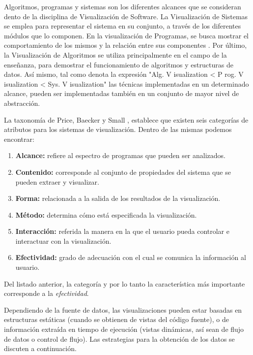 Algoritmos, programas y sistemas son los diferentes alcances que se consideran
dento de la disciplina de Visualización de Software.\cite{[PBS93][Mye90]}
La Visualización de Sistemas se emplea para representar el sistema en su conjunto,
a través de los diferentes módulos que lo componen.
En la visualización de Programas, se busca mostrar el comportamiento de los mismos
y la relación entre sus componentes \cite{BA01}.
Por último, la Visualización de Algoritmos se utiliza principalmente en el campo de la enseñanza,
para demostrar el funcionamiento de algoritmos y estructuras de datos.
Así mismo, tal como denota la expresión 
"Alg. V isualization < P rog. V isualization < Sys. V isualization"\cite{PIROBV-YDS-2007}
las técnicas implementadas en un determinado alcance, pueden ser implementadas
también en un conjunto de mayor nivel de abstracción.

La taxonomía de Price, Baecker y Small \cite{PriceBaeckerSmallXX}, establece que
existen seis categorías de atributos para los sistemas de visualización.
Dentro de las mismas podemos encontrar:
\begin{enumerate}
    \item \textbf{Alcance:} refiere al espectro de programas que pueden ser analizados.
    \item \textbf{Contenido:} corresponde al conjunto de propiedades del sistema que se pueden
    extraer y visualizar.
    \item \textbf{Forma:} relacionada a la salida de los resultados de la visualización.
    \item \textbf{Método:} determina cómo está especificada la visualización.
    \item \textbf{Interacción:} referida la manera en la que el usuario pueda controlar e
    interactuar con la visualización.
    \item \textbf{Efectividad:} grado de adecuación con el cual se comunica la información
    al usuario.
\end{enumerate}
Del listado anterior, la categoría y por lo tanto la característica más importante corresponde
a la \textit{efectividad}.

Dependiendo de la fuente de datos, las visualizaciones pueden estar basadas en
estructuras estáticas (cuando se obtienen de vistas del código fuente), o de
información extraída en tiempo de ejecución (vistas dinámicas, así sean de flujo de datos
o control de flujo). \cite{PetreDeQuency06}
Las estrategias para la obtención de los datos se discuten a continuación.


